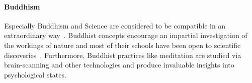 \paragraph{Buddhism}
Especially Buddhism and Science are considered to be compatible in an extraordinary way~\cite{yong2005buddhism}.
Buddhist concepts encourage an impartial investigation of the workings of nature and most of their schools have been open to scientific discoveries~\cite{lopez2009buddhism}.
Furthermore, Buddhist practices like meditation are studied via brain-scanning and other technologies and produce invaluable insights into psychological states.